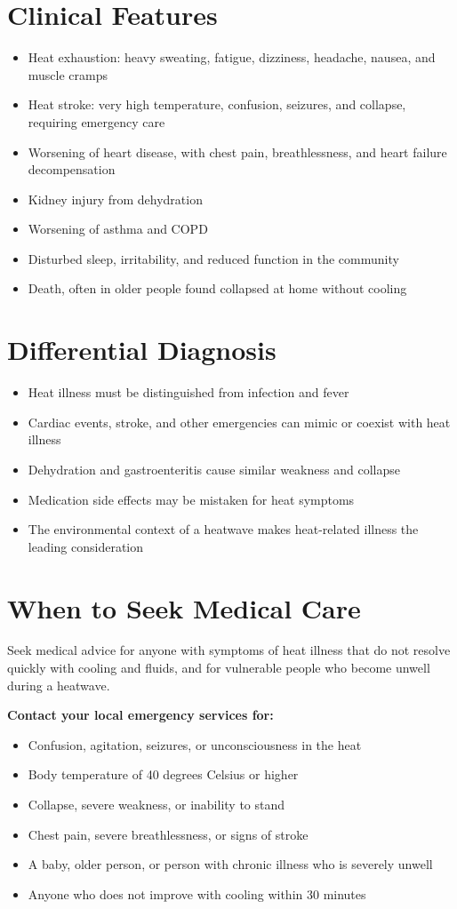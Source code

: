 \section*{Clinical Features}
\begin{itemize}
    \item Heat exhaustion: heavy sweating, fatigue, dizziness, headache, nausea, and muscle cramps
    \item Heat stroke: very high temperature, confusion, seizures, and collapse, requiring emergency care
    \item Worsening of heart disease, with chest pain, breathlessness, and heart failure decompensation
    \item Kidney injury from dehydration
    \item Worsening of asthma and COPD
    \item Disturbed sleep, irritability, and reduced function in the community
    \item Death, often in older people found collapsed at home without cooling
\end{itemize}

\section*{Differential Diagnosis}
\begin{itemize}
    \item Heat illness must be distinguished from infection and fever
    \item Cardiac events, stroke, and other emergencies can mimic or coexist with heat illness
    \item Dehydration and gastroenteritis cause similar weakness and collapse
    \item Medication side effects may be mistaken for heat symptoms
    \item The environmental context of a heatwave makes heat-related illness the leading consideration
\end{itemize}

\section*{When to Seek Medical Care}
Seek medical advice for anyone with symptoms of heat illness that do not resolve quickly with cooling and fluids, and for vulnerable people who become unwell during a heatwave.

\textbf{Contact your local emergency services for:}
\begin{itemize}
    \item Confusion, agitation, seizures, or unconsciousness in the heat
    \item Body temperature of 40 degrees Celsius or higher
    \item Collapse, severe weakness, or inability to stand
    \item Chest pain, severe breathlessness, or signs of stroke
    \item A baby, older person, or person with chronic illness who is severely unwell
    \item Anyone who does not improve with cooling within 30 minutes
\end{itemize}

